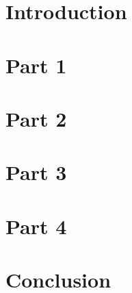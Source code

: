 \documentclass{article}
\begin{document}
\begin{titlepage}

\end{titlepage}
\section{Introduction}

\section{Part 1}

\section{Part 2}

\section{Part 3}

\section{Part 4}

\section{Conclusion}

\end{document}
